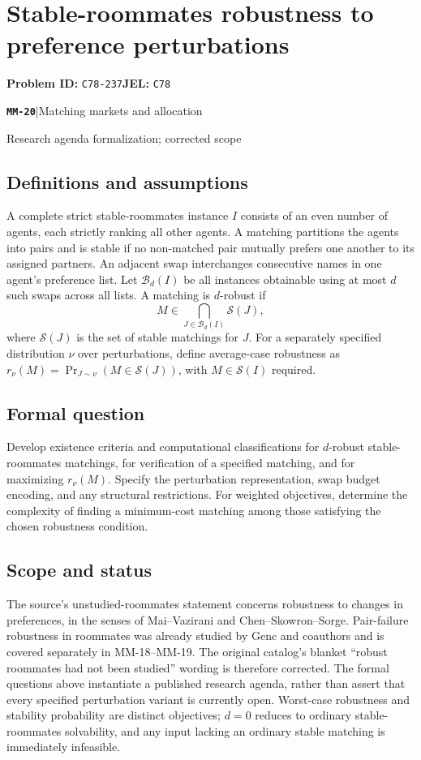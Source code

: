 \documentclass[11pt,a4paper]{article}
\newcommand{\entrymeta}[3]{{\sffamily\small\color{muted}\textbf{\texttt{#1}}\quad|\quad #2\par #3\par}}
\begin{document}
\section*{Stable-roommates robustness to preference perturbations}
\textbf{Problem ID:} \texttt{C78-237}\quad \textbf{JEL:} \texttt{C78}\par
\label{problem:OP-0561}
\label{beyond:MM-20}
\entrymeta{MM-20}{Matching markets and allocation}{Research agenda formalization; corrected scope}
\subsection*{Definitions and assumptions}
A complete strict stable-roommates instance $I$ consists of an even number of agents, each strictly ranking all other agents. A matching partitions the agents into pairs and is stable if no non-matched pair mutually prefers one another to its assigned partners. An adjacent swap interchanges consecutive names in one agent's preference list. Let $\mathcal B_d(I)$ be all instances obtainable using at most $d$ such swaps across all lists. A matching is $d$-robust if
\[
 M\in\bigcap_{J\in\mathcal B_d(I)}\mathcal S(J),
\]
where $\mathcal S(J)$ is the set of stable matchings for $J$. For a separately specified distribution $\nu$ over perturbations, define average-case robustness as $r_\nu(M)=\Pr_{J\sim\nu}(M\in\mathcal S(J))$, with $M\in\mathcal S(I)$ required.
\subsection*{Formal question}
Develop existence criteria and computational classifications for $d$-robust stable-roommates matchings, for verification of a specified matching, and for maximizing $r_\nu(M)$. Specify the perturbation representation, swap budget encoding, and any structural restrictions. For weighted objectives, determine the complexity of finding a minimum-cost matching among those satisfying the chosen robustness condition.
\subsection*{Scope and status}
The source's unstudied-roommates statement concerns robustness to changes in preferences, in the senses of Mai--Vazirani and Chen--Skowron--Sorge. Pair-failure robustness in roommates was already studied by Genc and coauthors and is covered separately in MM-18--MM-19. The original catalog's blanket ``robust roommates had not been studied'' wording is therefore corrected. The formal questions above instantiate a published research agenda, rather than assert that every specified perturbation variant is currently open. Worst-case robustness and stability probability are distinct objectives; $d=0$ reduces to ordinary stable-roommates solvability, and any input lacking an ordinary stable matching is immediately infeasible.
\end{document}
